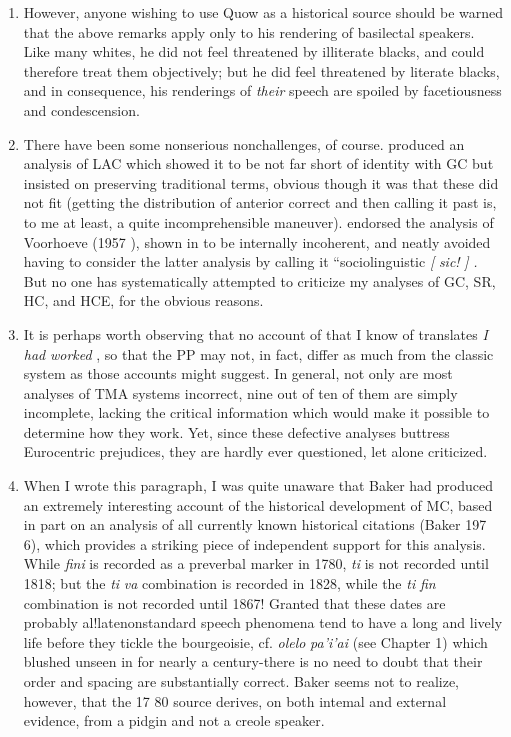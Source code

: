\begin{enumerate}
\item However, anyone wishing to use Quow as a historical source should be warned that the above remarks apply only to his rendering of basilectal speakers. Like many whites, he did not feel threatened by illiterate blacks, and could therefore treat them objectively; but he did feel threatened by literate blacks, and in consequence, his ren\-derings of \textit{their} speech are spoiled by facetiousness and condescension.
\item There have been some nonserious nonchallenges, of course. \citet{Christie1976} produced an analysis of LAC which showed it to be not far short of identity with GC but insisted on preserving traditional terms, obvious though it was that these did not fit (getting the distri\-bution of anterior correct and then calling it past is, to me at least, a quite incomprehensible maneuver). \citet{Seuren1980} endorsed the analysis of Voorhoeve (1957 ), shown in \citet{Bickerton1975} to be intern\-ally incoherent, and neatly avoided having to consider the latter analy\-sis by calling it ``sociolinguistic \textit{[} \textit{sic!} \textit{]} \textit{.} But no one has systematically attempted to criticize my analyses of GC, SR, HC, and HCE, for the obvious reasons.
\item It is perhaps worth observing that no account of  that I know of translates \textit{I} \textit{had} \textit{worked} , so that the PP  may not, in fact, differ as much from the classic system as those ac\-counts might suggest. In general, not only are most analyses of TMA systems incorrect, nine out of ten of them are simply incomplete, lacking the critical information which would make it possible to deter\-mine how they work. Yet, since these defective analyses buttress Euro\-centric prejudices, they are hardly ever questioned, let alone criticized.
\item When I wrote this paragraph, I was quite unaware that Baker had produced an extremely interesting account of the historical de\-velopment of MC, based in part on an analysis of all currently known historical citations (Baker 197 6), which provides a striking piece of independent support for this analysis. While \textit{fini} is recorded as a pre\-verbal marker in 1780, \textit{ti }is not recorded until 1818; but the \textit{ti} \textit{va}
combination is recorded in 1828, while the \textit{ti} \textit{fin} combination is not recorded until 1867! Granted that these dates are probably al!late\-nonstandard speech phenomena tend to have a long and lively life before they tickle the bourgeoisie, cf. \textit{olelo} \textit{pa'i'ai} (see Chapter 1) which blushed unseen in  for nearly a century-there is no need to doubt that their order and spacing are substantially correct. Baker seems not to realize, however, that the 17 80 source derives, on both intemal and external evidence, from a pidgin and not a creole speaker.

\end{enumerate}
